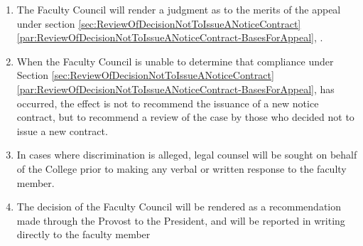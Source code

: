 \begin{enumerate}[label=\alph*)]
{\begin{enumerate}[label=\arabic*)]
						\end{enumerate}
					}
					\item{The Faculty Council will render a judgment as to the merits of the appeal under
						section
						\ref{sec:ReviewOfDecisionNotToIssueANoticeContract}
						\ref{par:ReviewOfDecisionNotToIssueANoticeContract-BasesForAppeal},
						.}
					\item{When the Faculty Council is unable to determine that compliance under
						Section
						\ref{sec:ReviewOfDecisionNotToIssueANoticeContract}
						\ref{par:ReviewOfDecisionNotToIssueANoticeContract-BasesForAppeal},
						has occurred, the effect is not to recommend the issuance of a new notice contract, but to recommend a review of the case by those who decided not to issue a new contract.}
					\item{In cases where discrimination is alleged, legal counsel will be sought on behalf of the College prior to making any verbal or written response to the faculty member.}
					\item{The decision of the Faculty Council will be rendered as a recommendation made through the Provost to the President, and will be reported in writing directly to the faculty member}
				\end{enumerate}
